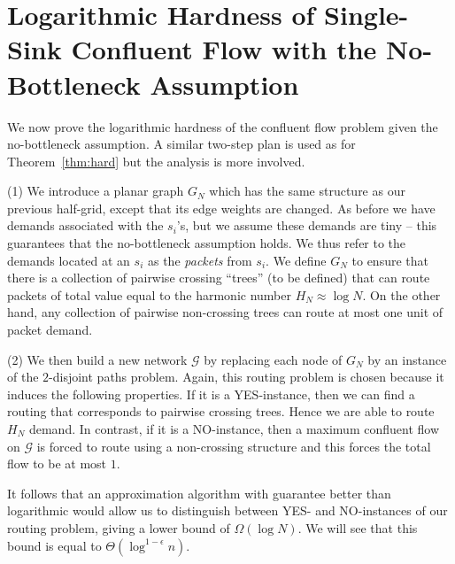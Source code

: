 \documentclass[12pt]{article}
\begin{document}
\section{Logarithmic Hardness of Single-Sink Confluent Flow with the No-Bottleneck Assumption}
\label{sec:confwithNBA}

We now prove the logarithmic hardness of the confluent flow problem given
the no-bottleneck assumption.
A similar two-step plan is used as for Theorem~\ref{thm:hard} but the analysis is
more involved.

(1) We introduce a planar graph $G_N$ which has the same structure as our previous half-grid, except
that its edge weights are changed. As before we  have demands associated with the $s_i$'s, but we assume these demands
are tiny -- this  guarantees that the no-bottleneck assumption holds.
We thus refer to the demands located at an $s_i$ as the {\em  packets} from $s_i$.
We define $G_N$ to ensure that there is a
collection of pairwise crossing ``trees'' (to be defined) that can route
packets of total value equal to the harmonic number $H_N\approx \log N$.
On the other hand, any collection of pairwise non-crossing trees can route at
most one unit of packet demand.


(2) We then build a new network $\mathcal{G}$ by replacing each node of $G_N$ by
an instance of the $2$-disjoint paths problem. Again, this routing problem is chosen
because it induces the following properties. If it is a YES-instance, then we can find a routing that
corresponds to pairwise crossing trees. Hence we are able to route $H_N$ demand.
In contrast, if it is a NO-instance, then a maximum confluent flow on $\mathcal{G}$ is forced to route using a non-crossing
structure and this forces the total flow to be at most $1$.


It follows that an approximation algorithm with guarantee better than
logarithmic would allow us to distinguish between YES- and NO-instances of our
routing problem, giving a lower bound of $\Omega(\log N)$. We will see that
this bound is equal to $\Theta(\log^{1-\epsilon} n)$.
\end{document}

